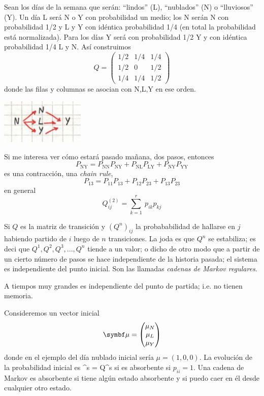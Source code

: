 \documentclass[10pt,oneside]{CBFT_book}
\begin{document}
Sean los días de la semana que serán: ``lindos'' (L), ``nublados'' (N) o ``lluviosos'' (Y).
Un día L será N o Y con probabilidad un medio; los N serán N con probabilidad 1/2 y L y Y con
idéntica probabilidad 1/4 (en total la probabilidad está normalizada). Para los días Y será
con probabilidad 1/2 Y y con idéntica probabilidad 1/4 L y N. Así construimos
\[
	Q = \begin{pmatrix}
		1/2 & 1/4 & 1/4 \\
		1/2 & 0 & 1/2 \\
		1/4 & 1/4 & 1/2
	\end{pmatrix} 
\]
donde las filas y columnas se asocian con N,L,Y en ese orden.

\includegraphics[width=0.30\textwidth]{images/1606329199.jpg}

Si me interesa ver cómo estará pasado mañana, dos pasos, entonces
\[
	P_{\text{NY}} = P_{\text{NN}} P_{\text{NY}} +
			P_{\text{NL}} P_{\text{LY}} +
			P_{\text{NY}} P_{\text{YY}}
\]
es una contracción, una {\it chain rule}, 
\[
	P_{13} = P_{11} P_{13} + P_{12} P_{23} + P_{13} P_{23}
\]
en general
\[
	Q_{ij}^{(2)} = \sum_{k=1}^r \ p_{ik} p_{kj}
\]

Si $Q$ es la matriz de transición y $(Q^n)_{ij}$ la probababilidad de hallarse en $j$ habiendo
partido de $i$ luego de $n$ transiciones.
La joda es que $Q^n$ se estabiliza; es deci que $Q^1, Q^2, Q^3, ..., Q^n$ tiende a un valor;
o dicho de otro modo que a partir de un cierto número de pasos se hace independiente de la
historia pasada; el sistema es independiente del punto inicial.
Son las llamadas {\it cadenas de Markov regulares}.

A tiempos muy grandes es independiente del punto de partida; i.e. no tienen memoria.

Consideremos un vector inicial
\[
	\vb{\mu} = \begin{pmatrix}
		\mu_N \\
		\mu_L \\
		\mu_Y
	\end{pmatrix}
\]
donde en el ejemplo del día nublado inicial sería $\mu = (1,0,0)$. La evolución de la probabilidad
inicial es
\be
	\vb{\mu}^s = \vb{\mu} Q^s
	\label{markov_evol}
\ee
si es absorbente si $p_{ii} = 1$. Una cadena de Markov es absorbente si tiene algún estado absorbente
y si puedo caer en él desde cualquier otro estado.
\end{document}
